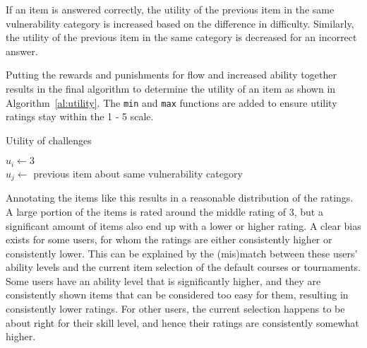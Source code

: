 If an item is answered correctly, the utility of the previous item in the same vulnerability category is increased based on the difference in difficulty.
Similarly, the utility of the previous item in the same category is decreased for an incorrect answer.

Putting the rewards and punishments for flow and increased ability together results in the final algorithm to determine the utility of an item as shown in Algorithm~\ref{al:utility}.
The \texttt{min} and \texttt{max} functions are added to ensure utility ratings stay within the 1 - 5 scale.

\begin{algorithm}[H]
\caption{\label{al:utility}Utility of challenges}
\SetAlgoLined
{}
$u_i \leftarrow 3$\\
$u_j \leftarrow$ previous item about same vulnerability category\\
    {
    }
\Else
    {
    }
\end{algorithm}

Annotating the items like this results in a reasonable distribution of the ratings.
A large portion of the items is rated around the middle rating of 3, but a significant amount of items also end up with a lower or higher rating.
A clear bias exists for some users, for whom the ratings are either consistently higher or consistently lower.
This can be explained by the (mis)match between these users' ability levels and the current item selection of the default courses or tournaments.
Some users have an ability level that is significantly higher, and they are consistently shown items that can be considered too easy for them, resulting in consistently lower ratings.
For other users, the current selection happens to be about right for their skill level, and hence their ratings are consistently somewhat higher.